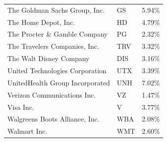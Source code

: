\documentclass{article}
\begin{document}
\begin{center}
\begin{table}[h]
\begin{tabular}{lll}
The Goldman Sachs Group, Inc.               & GS            & 5.94\%       \\
The Home Depot, Inc.                        & HD            & 4.79\%       \\
The Procter \& Gamble Company               & PG            & 2.32\%       \\
The Travelers Companies, Inc.               & TRV           & 3.32\%       \\
The Walt Disney Company                     & DIS           & 3.16\%       \\
United Technologies Corporation             & UTX           & 3.39\%       \\
UnitedHealth Group Incorporated             & UNH           & 7.02\%       \\
Verizon Communications Inc.                 & VZ            & 1.47\%       \\
Visa Inc.                                   & V             & 3.77\%       \\
Walgreens Boots Alliance, Inc.              & WBA           & 2.08\%       \\
Walmart Inc.                                & WMT           & 2.60\%      
\end{tabular}
\end{table}
\end{center}
\end{document}
